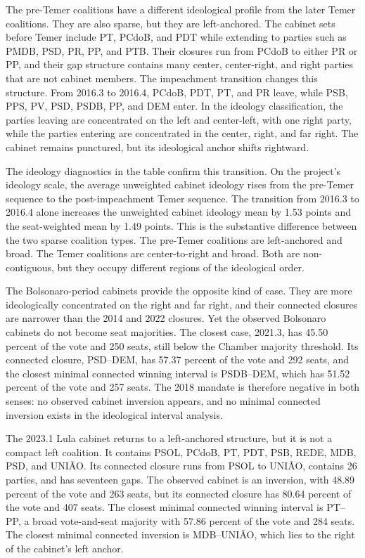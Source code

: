 \documentclass[11pt]{article}
\begin{document}
The pre-Temer coalitions have a different ideological profile from the later
Temer coalitions. They are also sparse, but they are left-anchored. The cabinet
sets before Temer include PT, PCdoB, and PDT while extending to parties such
as PMDB, PSD, PR, PP, and PTB. Their closures run from PCdoB to either PR or
PP, and their gap structure contains many center, center-right, and right parties
that are not cabinet members. The impeachment transition changes this structure.
From 2016.3 to 2016.4, PCdoB, PDT, PT, and PR leave, while PSB, PPS, PV, PSD,
PSDB, PP, and DEM enter. In the ideology classification, the parties leaving are
concentrated on the left and center-left, with one right party, while the parties
entering are concentrated in the center, right, and far right. The cabinet remains
punctured, but its ideological anchor shifts rightward.

The ideology diagnostics in the table confirm this transition. On the project's
ideology scale, the average unweighted cabinet ideology rises from the
pre-Temer sequence to the post-impeachment Temer sequence. The transition from
2016.3 to 2016.4 alone increases the unweighted cabinet ideology mean by 1.53
points and the seat-weighted mean by 1.49 points. This is the substantive
difference between the two sparse coalition types. The pre-Temer coalitions are
left-anchored and broad. The Temer coalitions are center-to-right and broad.
Both are non-contiguous, but they occupy different regions of the ideological
order.

The Bolsonaro-period cabinets provide the opposite kind of case. They are more
ideologically concentrated on the right and far right, and their connected
closures are narrower than the 2014 and 2022 closures. Yet the observed
Bolsonaro cabinets do not become seat majorities. The closest case, 2021.3, has
45.50 percent of the vote and 250 seats, still below the Chamber majority
threshold. Its connected closure, PSD--DEM, has 57.37 percent of the vote and
292 seats, and the closest minimal connected winning interval is PSDB--DEM,
which has 51.52 percent of the vote and 257 seats. The 2018 mandate is
therefore negative in both senses: no observed cabinet inversion appears, and no
minimal connected inversion exists in the ideological interval analysis.

The 2023.1 Lula cabinet returns to a left-anchored structure, but it is not a
compact left coalition. It contains PSOL, PCdoB, PT, PDT, PSB, REDE, MDB,
PSD, and UNIÃO. Its connected closure runs from PSOL to UNIÃO, contains 26
parties, and has seventeen gaps. The observed cabinet is an inversion, with
48.89 percent of the vote and 263 seats, but its connected closure has 80.64
percent of the vote and 407 seats. The closest minimal connected winning
interval is PT--PP, a broad vote-and-seat majority with 57.86 percent of the
vote and 284 seats. The closest minimal connected inversion is MDB--UNIÃO,
which lies to the right of the cabinet's left anchor.
\end{document}
